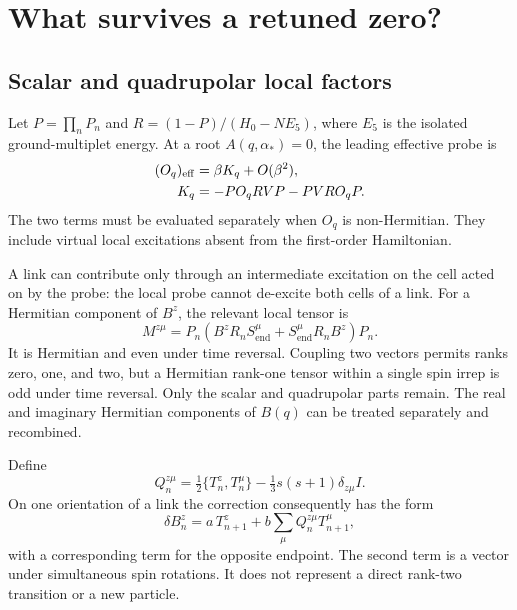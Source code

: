 \section{What survives a retuned zero?}

\subsection{Scalar and quadrupolar local factors}

Let $P=\prod_n P_n$ and $R=(1-P)/(H_0-NE_5)$, where $E_5$ is the isolated
ground-multiplet energy. At a root $A(q,\alpha_*)=0$, the leading effective
probe is
\begin{align}
 (O_q)_{\mathrm{eff}}&=\beta K_q+O(\beta^2),\notag\\
 K_q&=-P O_q R V P-P V R O_q P.
 \label{eq:rank-probe}
\end{align}
The two terms must be evaluated separately when $O_q$ is non-Hermitian.
They include virtual local excitations absent from the first-order
Hamiltonian.

A link can contribute only through an intermediate excitation on the cell
acted on by the probe: the local probe cannot de-excite both cells of a link.
For a Hermitian component of $B^z$, the relevant local tensor is
\begin{equation}
 M^{z\mu}=P_n(B^z R_n S_{\mathrm{end}}^\mu
                   +S_{\mathrm{end}}^\mu R_n B^z)P_n.
 \label{eq:rank-local-tensor}
\end{equation}
It is Hermitian and even under time reversal. Coupling two vectors permits
ranks zero, one, and two, but a Hermitian rank-one tensor within a single
spin irrep is odd under time reversal. Only the scalar and quadrupolar parts
remain. The real and imaginary Hermitian components of $B(q)$ can be treated
separately and recombined.

Define
\begin{equation}
 Q_n^{z\mu}=\tfrac12\{T_n^z,T_n^\mu\}
        -\tfrac13 s(s+1)\delta_{z\mu}I.
\end{equation}
On one orientation of a link the correction consequently has the form
\begin{equation}
 \delta B_n^z=a\,T_{n+1}^z
       +b\sum_\mu Q_n^{z\mu}T_{n+1}^\mu,
 \label{eq:rank-link}
\end{equation}
with a corresponding term for the opposite endpoint.
The second term is a vector under simultaneous spin rotations. It does not
represent a direct rank-two transition or a new particle.

